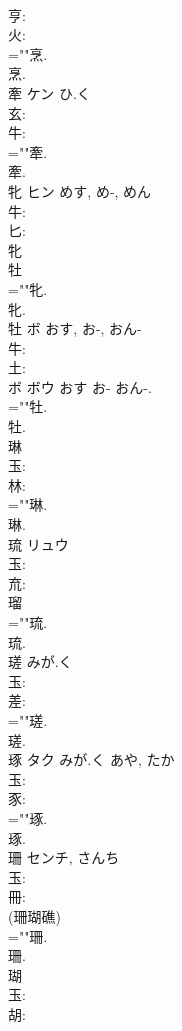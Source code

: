 \documentclass[8pt]{extreport}
\begin{document}
\begin{CJK}{UTF8}{min}
\\	亨: 
\\	火: 
\\	=""烹.
\\	烹.
\\	牽	ケン	ひ.く		
\\	玄: 
\\	牛: 
\\	=""牽.
\\	牽.
\\	牝	ヒン	めす, め-, めん		
\\	牛: 
\\	匕: 
\\	牝 
\\	牡 
\\	=""牝.
\\	牝.
\\	牡	ボ	おす, お-, おん-		
\\	牛: 
\\	土: 
\\	ボ ボウ おす お- おん-.
\\	=""牡.
\\	牡.
\\	琳						
\\	玉: 
\\	林: 
\\	=""琳.
\\	琳.
\\	琉	リュウ			
\\	玉: 
\\	㐬: 
\\	瑠 
\\	=""琉.
\\	琉.
\\	瑳		みが.く				
\\	玉: 
\\	差: 
\\	=""瑳.
\\	瑳.
\\	琢	タク	みが.く	あや, たか	
\\	玉: 
\\	豕: 
\\	=""琢.
\\	琢.
\\	珊		センチ, さんち				
\\	玉: 
\\	冊: 
\\	(珊瑚礁) 
\\	=""珊.
\\	珊.
\\	瑚						
\\	玉: 
\\	胡: 

\end{CJK}
\end{document}
